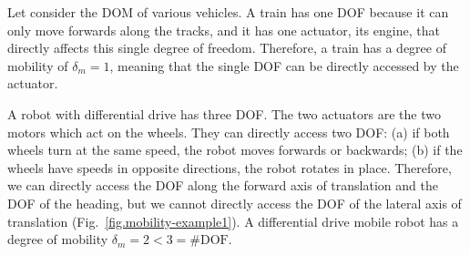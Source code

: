 Let consider the DOM of various vehicles. A train has one DOF because it can only move forwards along the tracks, and it has one actuator, its engine, that directly affects this single degree of freedom. Therefore, a train has a degree of mobility of $\delta_m = 1$, meaning that the single DOF can be directly accessed by the actuator.

A robot with differential drive has three DOF. The two actuators are the two motors which act on the wheels. They can directly access two DOF: (a) if both wheels turn at the same speed, the robot moves forwards or backwards; (b) if the wheels have speeds in opposite directions, the robot rotates in place. Therefore, we can directly access the DOF along the forward axis of translation and the DOF of the heading, but we cannot directly access the DOF of the lateral axis of translation (Fig.~\ref{fig.mobility-example1}). A differential drive mobile robot has a degree of mobility $\delta_m = 2 < 3 = \#\textrm{DOF}$.

